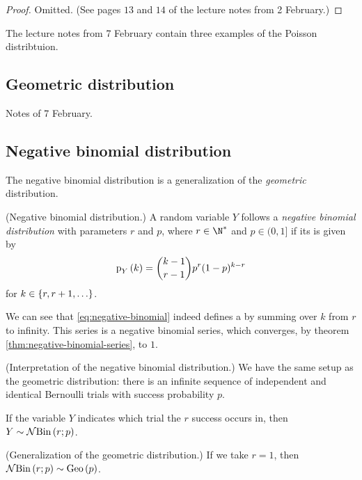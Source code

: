\documentclass[11pt]{article}
\begin{document}
\begin{proof}
    Omitted. (See pages $13$ and $14$ of the lecture notes from 2 February.)
\end{proof}

The lecture notes from 7 February contain three examples of the Poisson
distribtuion.

\subsection{Geometric distribution}

Notes of 7 February.

\subsection{Negative binomial distribution}

The negative binomial distribution is a generalization of the \emph{geometric}
distribution.

\begin{defn}{(Negative binomial distribution.)}
    \label{def:negative-binomial}
    A random variable $Y$ follows a \emph{negative binomial distribution} with
    parameters $r$ and $p$, where $r \in \N^*$ and $p \in (0, 1]$ if its \pmf{}
    is given by
    \begin{equation*}
        \label{eq:negative-binomial}
        \p[Y]{k} = \binom{k-1}{r-1} p^r (1-p)^{k-r}
    \end{equation*}
    for $k \in \left\{r, r+1, \ldots\right\}$.
\end{defn}

We can see that \eqref{eq:negative-binomial} indeed defines a \pmf{} by summing
over $k$ from $r$ to infinity. This series is a negative binomial series, which
converges, by theorem \ref{thm:negative-binomial-series}, to $1$.

\begin{rem}{(Interpretation of the negative binomial distribution.)}
    \label{rem:negative-binomial-interpretation}
    We have the same setup as the geometric distribution:
    there is an infinite sequence of independent and identical Bernoulli
    trials with success probability $p$.

    If the variable $Y$ indicates which trial the $r$\th{} success occurs in,
    then $Y \sim \operatorname{\mathcal{N}Bin}\left(r; p\right)$.
\end{rem}

\begin{rem}{(Generalization of the geometric distribution.)}
    If we take $r = 1$, then $\operatorname{\mathcal{N}Bin}\left(r;p\right) \sim \operatorname{Geo}\left(p\right)$.
\end{rem}
\end{document}
